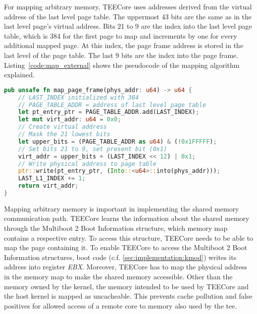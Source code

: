 For mapping arbitrary memory, TEECore uses addresses derived from the virtual
address of the last level page table. The uppermost 43 bits are the same as in
the last level page's virtual address. Bits 21 to 9 are the index into the last
level page table, which is 384 for the first page to map and increments by one
for every additional mapped page. At this index, the page frame address is
stored in the last level of the page table. The last 9 bits are the index into
the page frame. Listing~\ref{code:map_external} shows the pseudocode of the
mapping algorithm explained.

\begin{lstlisting}[language=Rust, caption=Mapping of external memory, label=code:map_external]
pub unsafe fn map_page_frame(phys_addr: u64) -> u64 {
    // LAST_INDEX initialized with 384
    // PAGE_TABLE_ADDR = address of last level page table
    let pt_entry_ptr = PAGE_TABLE_ADDR.add(LAST_INDEX);
    let mut virt_addr: u64 = 0x0;
    // Create virtual address
    // Mask the 21 lowest bits
    let upper_bits = (PAGE_TABLE_ADDR as u64) & (!0x1FFFFF);
    // Set bits 21 to 9, set present bit (0x1)
    virt_addr = upper_bits + (LAST_INDEX << 12) | 0x1;
    // Write physical address to page table
    ptr::write(pt_entry_ptr, (Into::<u64>::into(phys_addr)));
    LAST_L1_INDEX += 1;
    return virt_addr;
}
\end{lstlisting}

Mapping arbitrary memory is important in implementing the shared memory
communication path. TEECore learns the information about the shared memory
through the Multiboot 2 Boot Information structure, which memory map contains a
respective entry. To access this structure, TEECore needs to be able to map the
page containing it. To enable TEECore to access the Multiboot 2 Boot Information
structures, boot code (c.f. \ref{sec:implementation:kmod}) writes its address
into register \textit{EBX}. Moreover, TEECore has to map the physical address in
the memory map to make the shared memory accessible. Other than the memory owned
by the kernel, the memory intended to be used by TEECore and the host kernel is
mapped as uncacheable. This prevents cache pollution and false positives for
allowed access of a remote core to memory also used by the \gls{tee}.\\

